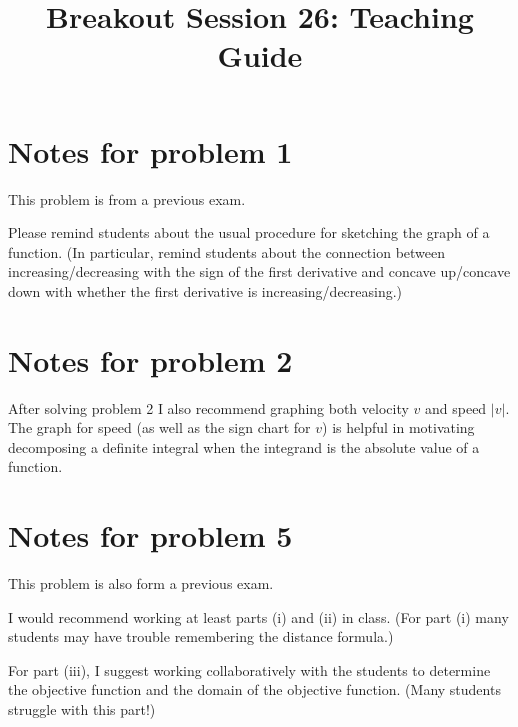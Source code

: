 \documentclass[handout, nooutcomes]{ximera}
\title{Breakout Session 26: Teaching Guide}
\begin{document}
\begin{abstract}

\end{abstract}
\maketitle

\section{Notes for problem 1}
This problem is from a previous exam.

Please remind students about the usual procedure for sketching the graph of a function.
(In particular, remind students about the connection between increasing/decreasing with the sign of the first derivative and concave up/concave down with whether the first derivative is increasing/decreasing.)

\section{Notes for problem 2}
After solving problem 2 I also recommend graphing both velocity $v$ and speed $|v|$.
The graph for speed (as well as the sign chart for $v$) is helpful in motivating decomposing a definite integral when the integrand is the absolute value of a function.

\section{Notes for problem 5}
This problem is also form a previous exam.

I would recommend working at least parts (i) and (ii) in class.
(For part (i) many students may have trouble remembering the distance formula.)

For part (iii), I suggest working collaboratively with the students to determine the objective function and the domain of the objective function.
(Many students struggle with this part!)
\end{document}
